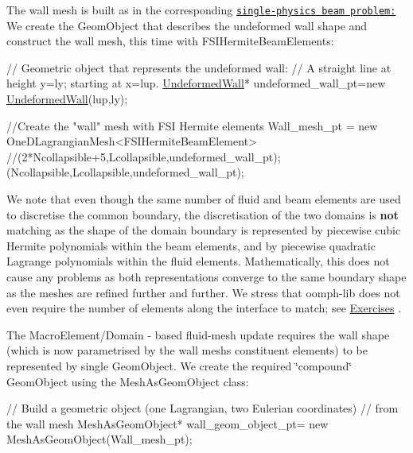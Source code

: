 The wall mesh is built as in the corresponding \href{../../../beam/tensioned_string/html/index.html}{\tt single-\/physics beam problem\+:} We create the {\ttfamily Geom\+Object} that describes the undeformed wall shape and construct the wall mesh, this time with {\ttfamily F\+S\+I\+Hermite\+Beam\+Elements\+:} 


\begin{DoxyCodeInclude}

 \textcolor{comment}{// Geometric object that represents the undeformed wall: }
 \textcolor{comment}{// A straight line at height y=ly; starting at x=lup.}
 \hyperlink{classUndeformedWall}{UndeformedWall}* undeformed\_wall\_pt=\textcolor{keyword}{new} \hyperlink{classUndeformedWall}{UndeformedWall}(lup,ly);

 \textcolor{comment}{//Create the "wall" mesh with FSI Hermite elements}
 Wall\_mesh\_pt = \textcolor{keyword}{new} OneDLagrangianMesh<FSIHermiteBeamElement>
  \textcolor{comment}{//(2*Ncollapsible+5,Lcollapsible,undeformed\_wall\_pt);}
  (Ncollapsible,Lcollapsible,undeformed\_wall\_pt);

\end{DoxyCodeInclude}


We note that even though the same number of fluid and beam elements are used to discretise the common boundary, the discretisation of the two domains is {\bfseries not} matching as the shape of the domain boundary is represented by piecewise cubic Hermite polynomials within the beam elements, and by piecewise quadratic Lagrange polynomials within the fluid elements. Mathematically, this does not cause any problems as both representations converge to the same boundary shape as the meshes are refined further and further. We stress that {\ttfamily oomph-\/lib} does not even require the number of elements along the interface to match; see \hyperlink{index_ex}{Exercises} .

The {\ttfamily Macro\+Element/\+Domain} -\/ based fluid-\/mesh update requires the wall shape (which is now parametrised by the wall mesh\textquotesingle{}s constituent elements) to be represented by single {\ttfamily Geom\+Object}. We create the required \char`\"{}compound\char`\"{} {\ttfamily Geom\+Object} using the {\ttfamily Mesh\+As\+Geom\+Object} class\+:


\begin{DoxyCodeInclude}

 

 \textcolor{comment}{// Build a geometric object (one Lagrangian, two Eulerian coordinates)}
 \textcolor{comment}{// from the wall mesh}
 MeshAsGeomObject* wall\_geom\_object\_pt=
  \textcolor{keyword}{new} MeshAsGeomObject(Wall\_mesh\_pt); 

\end{DoxyCodeInclude}



